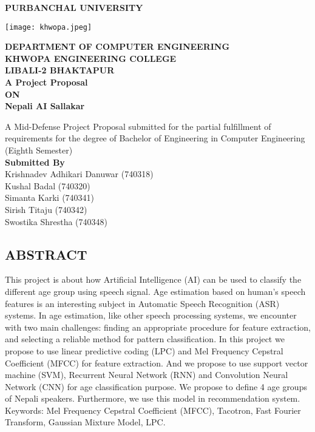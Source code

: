 \documentclass[a4paper,12pt]{article}
\begin{document}
\begin{titlepage}


\centering
\large\textbf{PURBANCHAL UNIVERSITY}
\begin{center}
\texttt{[image: khwopa.jpeg]}
\end{center}
\large\textbf{DEPARTMENT OF COMPUTER ENGINEERING
\\ KHWOPA ENGINEERING COLLEGE \\ LIBALI-2 BHAKTAPUR}
\\
[0.5cm]
\large\textbf{A Project Proposal \\ON\\ Nepali AI Sallakar}

A Mid-Defense Project Proposal submitted for the partial fulfillment of requirements for the degree of
Bachelor of Engineering in Computer Engineering (Eighth Semester)
\\
[1.5cm]
\large\textbf{Submitted By}\\
Krishnadev Adhikari Danuwar (740318) \\
Kushal Badal (740320)\\
Simanta Karki (740341)\\
Sirish Titaju (740342)\\
Swostika Shrestha (740348)\\
\date{June 2022}
\end{titlepage}
\pagebreak
\begin{center}
    \section*{ABSTRACT}
\end{center}
This project is about how Artificial Intelligence (AI) can be used to classify the different age
group using speech signal. Age estimation based on human’s speech features is an interesting
subject in Automatic Speech Recognition (ASR) systems. In age estimation, like other speech
processing systems, we encounter with two main challenges: finding an appropriate procedure
for feature extraction, and selecting a reliable method for pattern classification. In this project
we propose to use linear predictive coding (LPC) and Mel Frequency Cepstral Coefficient
(MFCC) for feature extraction. And we propose to use support vector machine (SVM),
Recurrent Neural Network (RNN) and Convolution Neural Network (CNN) for age
classification purpose. We propose to define 4 age groups of Nepali speakers. Furthermore, we
use this model in recommendation system.
Keywords: Mel Frequency Cepstral Coefficient (MFCC), Tacotron, Fast Fourier Transform,
Gaussian Mixture Model, LPC.
\pagebreak
\end{document}
